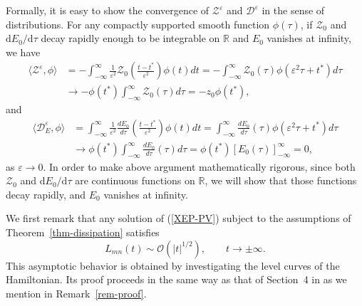 \documentclass{article}
\theoremstyle{definition}
\begin{document}
Formally, it is easy to show the convergence of $\mathscr{Z}^\varepsilon$ and $\mathscr{D}^\varepsilon$ in the sense of distributions. 
For any compactly supported smooth function $\phi(\tau)$, if $\mathscr{Z}_0$ and $\mbox{d}E_0/\mbox{d}\tau$ decay rapidly enough to be integrable on $\mathbb{R}$  
and $E_0$ vanishes at infinity,  we have
\begin{align*}
\langle \mathscr{Z}^\varepsilon, \phi \rangle & = - \int_{-\infty}^\infty \frac{1}{\varepsilon^2} \mathscr{Z}_0 \left( \frac{t - t^\ast}{\varepsilon^2} \right) \phi (t) dt = - \int_{-\infty}^\infty \mathscr{Z}_0(\tau) \phi (\varepsilon^2 \tau + t^\ast) d\tau \\
& \rightarrow - \phi(t^\ast) \int_{-\infty}^\infty \mathscr{Z}_0(\tau)d\tau = - z_0 \phi(t^\ast), 
\end{align*}
and
\begin{align*}
\langle \mathscr{D}_E^\varepsilon, \phi \rangle & = \int_{-\infty}^\infty \frac{1}{\varepsilon^2} \frac{dE_0}{d\tau} \left( \frac{t - t^\ast}{\varepsilon^2} \right) \phi (t) dt  = \int_{-\infty}^\infty \frac{dE_0}{d\tau} (\tau) \phi (\varepsilon^2 \tau + t^\ast) d\tau \\
& \rightarrow \phi(t^\ast) \int_{-\infty}^\infty \frac{dE_0}{d\tau}(\tau)d\tau = \phi(t^\ast) \left[ E_0(\tau) \right]_{-\infty}^\infty = 0,
\end{align*}
as $\varepsilon \rightarrow 0$. In order to make above argument mathematically rigorous, since both $\mathscr{Z}_0$ and $\mbox{d}E_0/\mbox{d}\tau$ are continuous functions on $\mathbb{R}$, we
will show that those functions decay rapidly, and $E_0$ vanishes at infinity.

We first remark that any solution of (\ref{XEP-PV}) subject to the assumptions of Theorem~\ref{thm-dissipation} satisfies
\begin{equation}
L_{mn}(t) \sim  \mathcal{O}(\vert t\vert^{1/2}), \qquad t \rightarrow \pm \infty.
\label{L-asympt}
\end{equation}
This asymptotic behavior is obtained by investigating the level curves of the Hamiltonian. Its proof proceeds in the same way as
that of Section~4 in \cite{G.2} as we mention in Remark~\ref{rem-proof}.
\end{document}
